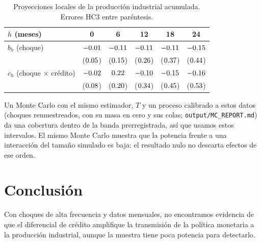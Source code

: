 \documentclass[11pt]{article}
\begin{document}
\begin{table}[h]
\centering
\begin{tabular}{lccccc}
\toprule
$h$ (meses) & 0 & 6 & 12 & 18 & 24 \\
\midrule
$b_h$ (choque) & $-0.01$ & $-0.11$ & $-0.11$ & $-0.11$ & $-0.15$ \\
 & ($0.05$) & ($0.15$) & ($0.26$) & ($0.37$) & ($0.44$) \\
$c_h$ (choque $\times$ crédito) & $-0.02$ & $0.22$ & $-0.10$ & $-0.15$ & $-0.16$ \\
 & ($0.08$) & ($0.20$) & ($0.34$) & ($0.45$) & ($0.53$) \\
\bottomrule
\end{tabular}
\caption{Proyecciones locales de la producción industrial acumulada. Errores HC3 entre paréntesis.}
\end{table}

Un Monte Carlo con el mismo estimador, $T$ y un proceso calibrado a estos datos (choques remuestreados, con su masa en
cero y sus colas; \texttt{output/MC\_REPORT.md}) da una cobertura dentro de la banda prerregistrada, así que usamos estos
intervalos. El mismo Monte Carlo muestra que la potencia frente a una interacción del tamaño simulado es baja: el
resultado nulo no descarta efectos de ese orden.

\section{Conclusión}
Con choques de alta frecuencia y datos mensuales, no encontramos evidencia de que el diferencial de crédito amplifique la
transmisión de la política monetaria a la producción industrial, aunque la muestra tiene poca potencia para detectarlo.
\end{document}
